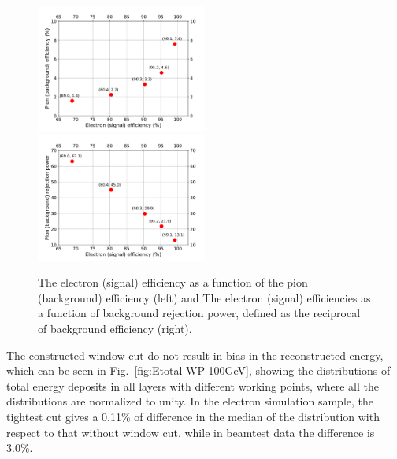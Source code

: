 \begin{figure}[!ht]
    \begin{center}  
    \includegraphics[width=0.5\textwidth]{Fig/fig_HGCAL/Working-Point-100GeV}~
    \includegraphics[width=0.5\textwidth]{Fig/fig_HGCAL/Working-Point-rejectionpower-100GeV}\\
    \caption{The electron (signal) efficiency as a function of the pion (background) efficiency (left) and The electron (signal) efficiencies as a function of background rejection power, defined as the reciprocal of background efficiency (right).}
    \label{fig:Window-WP}
    \end{center}
\end{figure}

The constructed window cut do not result in bias in the reconstructed energy, which can be seen in Fig.~\ref{fig:Etotal-WP-100GeV}, showing the distributions of total energy deposits in all layers with different working points, where all the distributions are normalized to unity. In the electron simulation sample, the tightest cut gives a 0.11\% of difference in the median of the distribution with respect to that without window cut, while in beamtest data the difference is 3.0\%.

